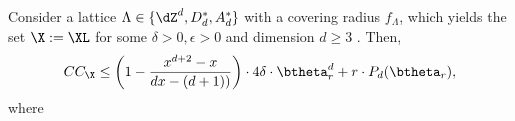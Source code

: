 \begin{thm}
  Consider a lattice $\Lambda\in \{\dZ^d,D_d^*,A_d^*\}$ with a covering radius $f_\Lambda$, which yields the \decomp set $\X:=\XL$ for some $\delta>0,\epsilon>0$ and dimension $d\geq 3$ . %
  Then,
    \begin{align}
        CC_\X\leq \left(1 - \frac{x^{d+2} - x}{ dx - (d+1))}\right) \cdot 4\delta \cdot  \btheta_r^d + r \cdot P_d(\btheta_r),
    \end{align}
    where 
\end{thm}
